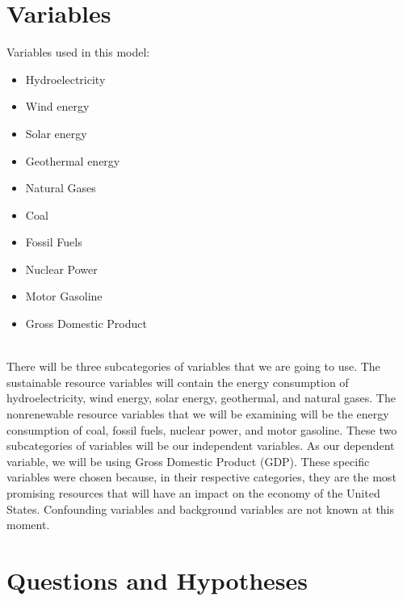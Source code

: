 \documentclass[14pt, titlepage]{article}
\begin{document}
	\newpage			
	
	\section*{Variables}
	
	Variables used in this model:
	
		\begin{itemize}
		
			\item Hydroelectricity

			\item Wind energy
			
			\item Solar energy
			
			\item Geothermal energy
			
			\item Natural Gases
			
			\item Coal
			
			\item Fossil Fuels
			
			\item Nuclear Power

			\item Motor Gasoline
			
			\item Gross Domestic Product
						
		\end{itemize} \\ There will be three subcategories of variables that we are going to use. The sustainable resource variables will contain the energy consumption of hydroelectricity, wind energy, solar energy, geothermal, and natural gases. The nonrenewable resource variables that we will be examining will be the energy consumption of coal, fossil fuels, nuclear power, and motor gasoline. These two subcategories of variables will be our independent variables. As our dependent variable, we will be using Gross Domestic Product (GDP). These specific variables were chosen because, in their respective categories, they are the most promising resources that will have an impact on the economy of the United States.  Confounding variables and background variables are not known at this moment.  


	
	\section*{Questions and Hypotheses}
\end{document}
